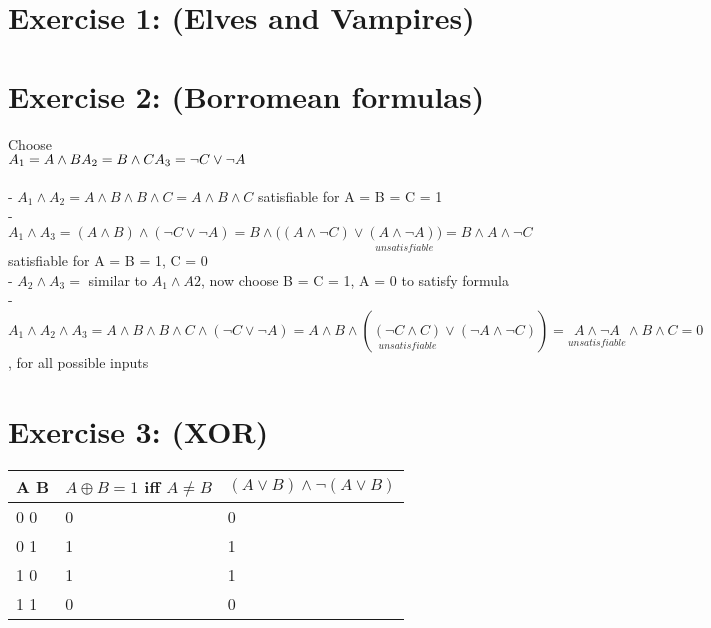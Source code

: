 \documentclass[12pt]{article}
\begin{document}
 

\rhead{\today}


\section*{Exercise 1: (Elves and Vampires)}


\section*{Exercise 2: (Borromean formulas)}

Choose \\
$ 
A_1 = A \land B \\
A_2 = B \land C \\
A_3 = \neg C \lor \neg A 
$ \\ \\
- $
	A_1 \land A_2 = A \land B \land B \land C = A \land B \land C $ 
	satisfiable for A = B = C = 1 \\
- $	A_1 \land A_3 = (A \land B) \land (\neg C \lor \neg A) = B \land ( (A \land \neg C) \lor \underset{unsatisfiable}{(A \land \neg A)) } = B \land A \land \neg C
	$ \\ satisfiable for A = B = 1, C = 0 \\
- $A_2 \land A_3 =$ similar to $A_1 \land A2
$, now choose B = C = 1, A = 0 to satisfy formula \\
- $A_1 \land A_2 \land A_3 = A \land B \land B \land C \land (\neg C \lor \neg A) = A \land B \land (\underset{unsatisfiable}{(\neg C \land C)}\lor(\neg A \land \neg C)) = \underset{unsatisfiable}{A \land \neg A} \land B \land C = 0
$ , for all possible inputs \\

\section*{Exercise 3: (XOR)}

\begin{tabular}{  l | l | l }
	A B & $ A \oplus B = 1 $ iff $A \neq B$ & $ (A \lor B) \land \neg(A \lor B) $ \\ \hline
	0 0 & 0 & 0 \\
	0 1 & 1 & 1 \\
	1 0 & 1 & 1 \\
	1 1 & 0 & 0 \\
\end{tabular} 
\\
\end{document}
